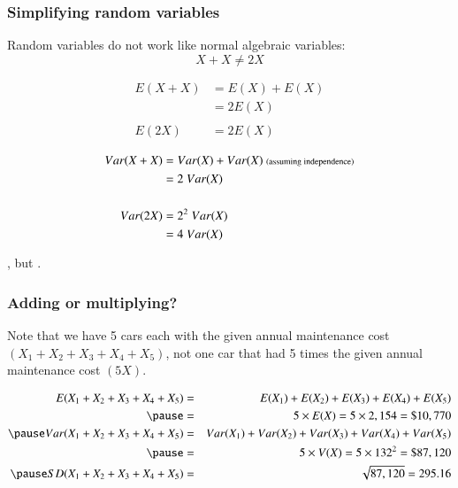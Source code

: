 \begin{frame}
\frametitle{Simplifying random variables}

Random variables do not work like normal algebraic variables:
\[ X + X \ne 2X \]

\pause

{\small
{}
{
\begin{align*}
E(X + X) &= E(X) + E(X) \\
&= 2 E(X) \\
&~  \\
E(2X) &= 2 E(X) \\
&~ 
\end{align*}
}
{
\begin{align*}
Var(X + X) &= Var(X) + Var(X)~{\scriptsize \text{(assuming independence)}} \\
&= 2~Var(X) \\
&~  \\
Var(2X) &= 2^2~Var(X) \\
&= 4~Var(X)
\end{align*}
}
}


\pause

\vspace{3mm}

, but .

\end{frame}


\begin{frame}
\frametitle{Adding or multiplying?}


\pause

Note that we have 5 cars each with the given annual maintenance cost $(X_1 + X_2 + X_3 + X_4 + X_5)$, not one car that had 5 times the given annual maintenance cost $(5X)$.

\pause

{\small
\begin{eqnarray*} 
E(X_1 + X_2 + X_3 + X_4 + X_5) &=& E(X_1) + E(X_2) + E(X_3) + E(X_4) + E(X_5) \\
\pause
&=& 5 \times E(X) = 5 \times 2,154 = \$ 10,770 \\
\pause
Var(X_1 + X_2 + X_3 + X_4 + X_5) &=& Var(X_1) + Var(X_2) + Var(X_3) + Var(X_4) + Var(X_5) \\
\pause
&=& 5 \times V(X) = 5 \times 132^2 = \$ 87,120 \\
\pause
SD(X_1 + X_2 + X_3 + X_4 + X_5) &=& \sqrt{87,120} =  295.16
\end{eqnarray*}
}

\end{frame}

